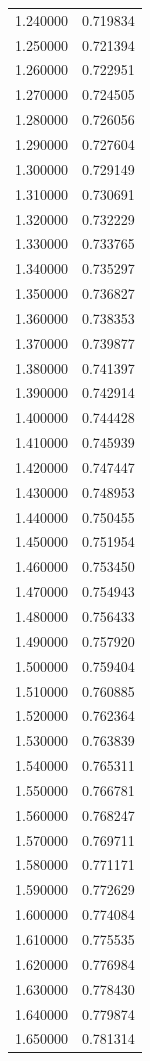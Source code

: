 \begin{tabular}{rr}
1.240000 & 0.719834 \\
1.250000 & 0.721394 \\
1.260000 & 0.722951 \\
1.270000 & 0.724505 \\
1.280000 & 0.726056 \\
1.290000 & 0.727604 \\
1.300000 & 0.729149 \\
1.310000 & 0.730691 \\
1.320000 & 0.732229 \\
1.330000 & 0.733765 \\
1.340000 & 0.735297 \\
1.350000 & 0.736827 \\
1.360000 & 0.738353 \\
1.370000 & 0.739877 \\
1.380000 & 0.741397 \\
1.390000 & 0.742914 \\
1.400000 & 0.744428 \\
1.410000 & 0.745939 \\
1.420000 & 0.747447 \\
1.430000 & 0.748953 \\
1.440000 & 0.750455 \\
1.450000 & 0.751954 \\
1.460000 & 0.753450 \\
1.470000 & 0.754943 \\
1.480000 & 0.756433 \\
1.490000 & 0.757920 \\
1.500000 & 0.759404 \\
1.510000 & 0.760885 \\
1.520000 & 0.762364 \\
1.530000 & 0.763839 \\
1.540000 & 0.765311 \\
1.550000 & 0.766781 \\
1.560000 & 0.768247 \\
1.570000 & 0.769711 \\
1.580000 & 0.771171 \\
1.590000 & 0.772629 \\
1.600000 & 0.774084 \\
1.610000 & 0.775535 \\
1.620000 & 0.776984 \\
1.630000 & 0.778430 \\
1.640000 & 0.779874 \\
1.650000 & 0.781314 \\

\end{tabular}
